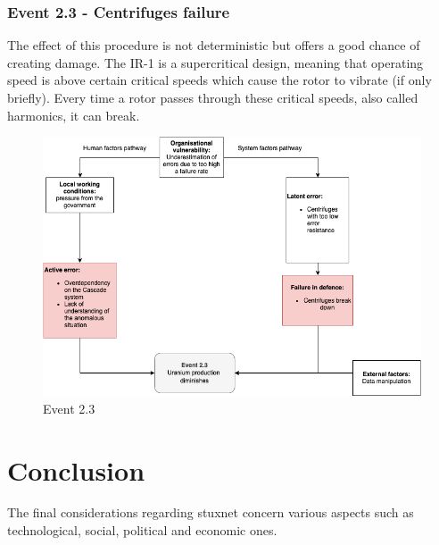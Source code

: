 \documentclass[12pt]{article}
\begin{document}
    \subsubsection{Event 2.3 - Centrifuges failure}
    The effect of this procedure is not deterministic but offers a good chance of creating damage. The IR-1 is a supercritical design, meaning that operating speed is above certain critical speeds which cause the rotor to vibrate (if only briefly). Every time a rotor passes through these critical speeds, also called harmonics, it can break. 
    
        \begin{figure}[H]
        \centering
        \includegraphics[width=\textwidth]{event23.png}
        \caption{Event 2.3}
        \label{fig:event23}
        \end{figure}
        
\section{Conclusion}
The final considerations regarding stuxnet concern various aspects such as technological, social, political and economic ones.
\end{document}
